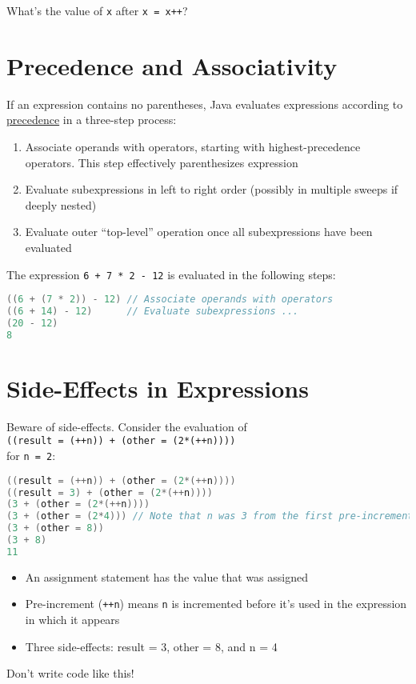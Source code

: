 \documentclass{article}
\begin{document}
What's the value of {\tt x} after {\tt x = x++}?




\section{Precedence and Associativity}


If an expression contains no parentheses, Java evaluates expressions according to \href{http://docs.oracle.com/javase/tutorial/java/nutsandbolts/operators.html}{precedence} in a three-step process:
\begin{enumerate}
\item Associate operands with operators, starting with highest-precedence operators.  This step effectively parenthesizes expression
\item Evaluate subexpressions in left to right order (possibly in multiple sweeps if deeply nested)
\item Evaluate outer ``top-level'' operation once all subexpressions have been evaluated
\end{enumerate}
The expression {\tt 6 + 7 * 2 - 12} is evaluated in the following steps:
\begin{lstlisting}[language=Java]
((6 + (7 * 2)) - 12) // Associate operands with operators
((6 + 14) - 12)      // Evaluate subexpressions ...
(20 - 12)
8
\end{lstlisting}





\section{Side-Effects in Expressions}

Beware of side-effects.  Consider the evaluation of\\{\tt ((result = (++n)) + (other = (2*(++n))))}\\ for {\tt n = 2}:
\begin{lstlisting}[language=Java]
((result = (++n)) + (other = (2*(++n))))
((result = 3) + (other = (2*(++n))))
(3 + (other = (2*(++n))))
(3 + (other = (2*4))) // Note that n was 3 from the first pre-increment
(3 + (other = 8))
(3 + 8)
11
\end{lstlisting}

\begin{itemize}
\item An assignment statement has the value that was assigned
\item Pre-increment ({\tt ++n}) means {\tt n} is incremented before it's used in the expression in which it appears
\item Three side-effects: result = 3, other = 8, and n = 4
\end{itemize}
Don't write code like this!
\end{document}

